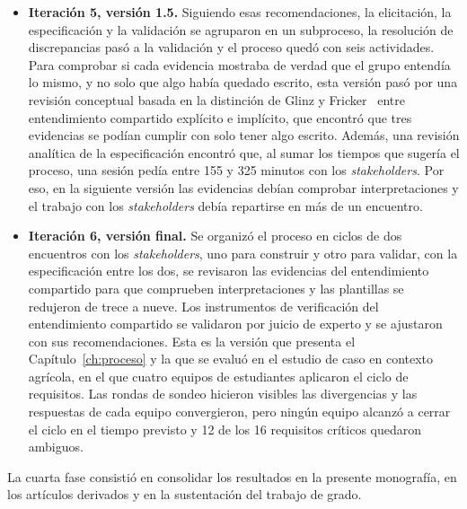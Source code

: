 \documentclass[12pt,letterpaper,oneside]{report}
\begin{document}
\begin{itemize}
  agrupar las tres actividades de la IR en una sola, que pudiera desglosarse como
  subproceso, porque son la base mínima del proceso, y resolver las discrepancias
  dentro de la validación, porque resolver conflictos hace parte de validar.
\item \textbf{Iteración 5, versión 1.5.} Siguiendo esas recomendaciones, la
  elicitación, la especificación y la validación se agruparon en un subproceso,
  la resolución de discrepancias pasó a la validación y el proceso quedó con seis
  actividades. Para comprobar si cada evidencia mostraba de verdad que el grupo
  entendía lo mismo, y no solo que algo había quedado escrito, esta versión pasó
  por una revisión conceptual basada en la distinción de Glinz y
  Fricker~\cite{glinz2015shared} entre entendimiento compartido explícito e
  implícito, que encontró que tres evidencias se podían cumplir con solo tener
  algo escrito. Además, una revisión analítica de la especificación encontró que,
  al sumar los tiempos que sugería el proceso, una sesión pedía entre 155 y 325
  minutos con los \textit{stakeholders}. Por eso, en la siguiente versión las
  evidencias debían comprobar interpretaciones y el trabajo con los
  \textit{stakeholders} debía repartirse en más de un encuentro.
\item \textbf{Iteración 6, versión final.} Se organizó el proceso en ciclos de
  dos encuentros con los \textit{stakeholders}, uno para construir y otro para
  validar, con la especificación entre los dos, se revisaron las evidencias del
  entendimiento compartido para que comprueben interpretaciones y las plantillas
  se redujeron de trece a nueve. Los instrumentos de verificación del
  entendimiento compartido se validaron por juicio de experto y se ajustaron con
  sus recomendaciones. Esta es la versión que presenta el
  Capítulo~\ref{ch:proceso} y la que se evaluó en el estudio de caso en contexto
  agrícola, en el que cuatro equipos de estudiantes aplicaron el ciclo de
  requisitos. Las rondas de sondeo hicieron visibles las divergencias y las
  respuestas de cada equipo convergieron, pero ningún equipo alcanzó a cerrar el
  ciclo en el tiempo previsto y 12 de los 16 requisitos críticos quedaron
  ambiguos.
\end{itemize}

La cuarta fase consistió en consolidar los resultados en la presente monografía,
en los artículos derivados y en la sustentación del trabajo de grado.
\end{document}
